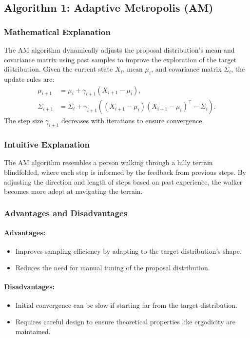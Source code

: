\documentclass{article}
\begin{document}
\subsection{Algorithm 1: Adaptive Metropolis (AM)}

\subsubsection{Mathematical Explanation}
The AM algorithm dynamically adjusts the proposal distribution's mean and covariance matrix using past samples to improve the exploration of the target distribution. Given the current state \(X_i\), mean \(\mu_i\), and covariance matrix \(\Sigma_i\), the update rules are:
\begin{align*}
\mu_{i+1} &= \mu_i + \gamma_{i+1}(X_{i+1} - \mu_i), \\
\Sigma_{i+1} &= \Sigma_i + \gamma_{i+1}((X_{i+1} - \mu_i)(X_{i+1} - \mu_i)^\top - \Sigma_i).
\end{align*}
The step size \(\gamma_{i+1}\) decreases with iterations to ensure convergence.

\subsubsection{Intuitive Explanation}
The AM algorithm resembles a person walking through a hilly terrain blindfolded, where each step is informed by the feedback from previous steps. By adjusting the direction and length of steps based on past experience, the walker becomes more adept at navigating the terrain.

\subsubsection{Advantages and Disadvantages}
\paragraph{Advantages:}
\begin{itemize}
    \item Improves sampling efficiency by adapting to the target distribution's shape.
    \item Reduces the need for manual tuning of the proposal distribution.
\end{itemize}

\paragraph{Disadvantages:}
\begin{itemize}
    \item Initial convergence can be slow if starting far from the target distribution.
    \item Requires careful design to ensure theoretical properties like ergodicity are maintained.
\end{itemize}
\end{document}
